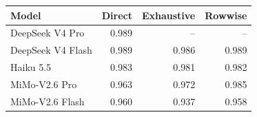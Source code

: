 \begin{tabular}{lrrr}
\toprule
Model & Direct & Exhaustive & Rowwise \\
\midrule
DeepSeek V4 Pro & 0.989 & -- & -- \\
DeepSeek V4 Flash & 0.989 & 0.986 & 0.989 \\
Haiku 5.5 & 0.983 & 0.981 & 0.982 \\
MiMo-V2.6 Pro & 0.963 & 0.972 & 0.985 \\
MiMo-V2.6 Flash & 0.960 & 0.937 & 0.958 \\
\bottomrule
\end{tabular}
